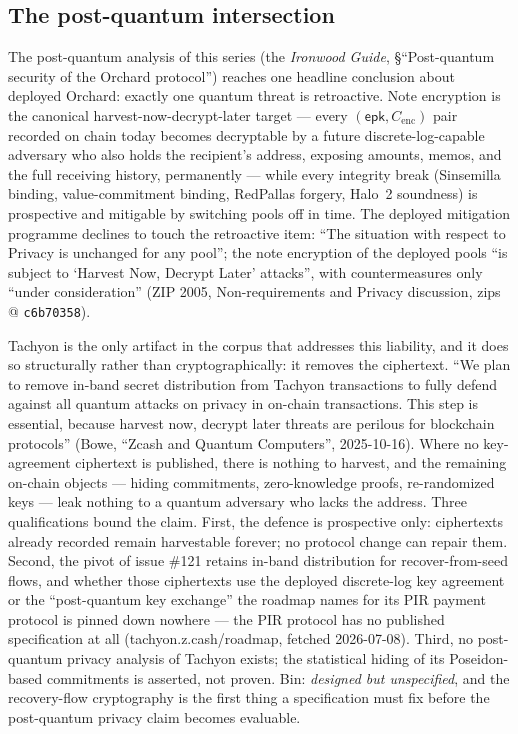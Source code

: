 \documentclass[11pt,a4paper]{article}
\theoremstyle{definition}
\begin{document}
\subsection{The post-quantum intersection}
\label{sec:tachyon-pq-intersection}

The post-quantum analysis of this series (the \emph{Ironwood Guide},
\S``Post-quantum security of the Orchard protocol'') reaches one headline
conclusion about deployed Orchard: exactly one quantum
threat is retroactive. Note encryption is the canonical
harvest-now-decrypt-later target --- every
$(\mathsf{epk}, C_{\mathrm{enc}})$ pair recorded on chain today becomes
decryptable by a future discrete-log-capable adversary who also holds the
recipient's address, exposing amounts, memos, and the full receiving
history, permanently --- while every integrity break (Sinsemilla binding,
value-commitment binding, RedPallas forgery, Halo~2 soundness) is
prospective and mitigable by switching pools off in time. The deployed
mitigation programme declines to touch the retroactive item: ``The
situation with respect to Privacy is unchanged for any pool''; the note
encryption of the deployed pools ``is subject to `Harvest Now, Decrypt
Later' attacks'', with countermeasures only ``under consideration'' (ZIP
2005, Non-requirements and Privacy discussion, zips @ \texttt{c6b70358}).

Tachyon is the only artifact in the corpus that addresses this liability,
and it does so structurally rather than cryptographically: it removes the
ciphertext. ``We plan to remove in-band secret distribution from Tachyon
transactions to fully defend against all quantum attacks on privacy in
on-chain transactions. This step is essential, because harvest now, decrypt
later threats are perilous for blockchain protocols'' (Bowe, ``Zcash and
Quantum Computers'', 2025-10-16). Where no key-agreement ciphertext is
published, there is nothing to harvest, and the remaining on-chain objects
--- hiding commitments, zero-knowledge proofs, re-randomized keys --- leak
nothing to a quantum adversary who lacks the address. Three qualifications
bound the claim. First, the defence is prospective only: ciphertexts
already recorded remain harvestable forever; no protocol change can repair
them. Second, the pivot of issue \#121 retains in-band distribution for
recover-from-seed flows, and whether those ciphertexts use the deployed
discrete-log key agreement or the ``post-quantum key exchange'' the roadmap
names for its PIR payment protocol is pinned down nowhere --- the PIR
protocol has no published specification at all (tachyon.z.cash/roadmap,
fetched 2026-07-08). Third, no post-quantum privacy analysis of Tachyon
exists; the statistical hiding of its Poseidon-based commitments is
asserted, not proven. Bin: \emph{designed but unspecified}, and the
recovery-flow cryptography is the first thing a specification must fix
before the post-quantum privacy claim becomes evaluable.
\end{document}
